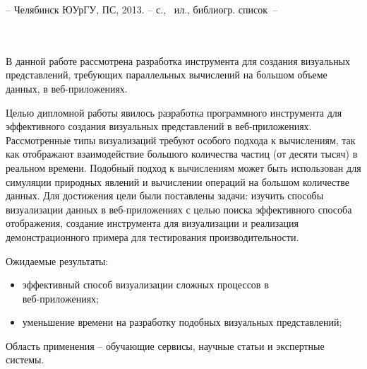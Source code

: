 \newpage
{}

\hfill
\begin{minipage}[t]{0.62\textwidth}
  \ESKDtheAuthor \space \ESKDtheDocName -- Челябинск ЮУрГУ, ПС, 2013. --  с., ~ил., библиогр. список~--~
\end{minipage} \\
\\

В данной работе рассмотрена разработка инструмента для создания визуальных
представлений, требующих параллельных вычислений на большом объеме данных, 
в веб-приложениях.

Целью дипломной работы явилось разработка программного инструмента для эффективного
создания визуальных представлений в веб-приложениях. Рассмотренные типы
визуализаций требуют особого подхода к вычислениям, так как отображают
взаимодействие большого количества частиц (от десяти тысяч) в реальном времени.
Подобный подход к вычислениям может быть использован для симуляции природных явлений 
и вычислении операций на большом количестве данных. Для достижения цели были поставлены
задачи: изучить способы визуализации данных в веб-приложениях с целью поиска эффективного
способа отображения, создание инструмента для визуализации и реализация демонстрационного 
примера для тестирования производительности.

Ожидаемые результаты:

\begin{itemize}
  \item эффективный способ визуализации сложных процессов в \\веб-приложениях;
  \item уменьшение времени на разработку подобных визуальных представлений;
\end{itemize}

Область применения -- обучающие сервисы, научные статьи и экспертные системы.
